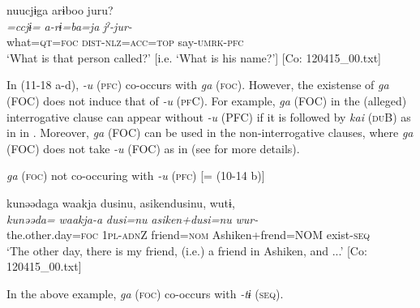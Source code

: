   \ex  
      \glll    nuucjɨga  arɨboo  juru?\\
      \textit{=ccjɨ=}  \textit{a-rɨ=ba=ja}  \textit{jˀ-jur-}\\
      what=\textsc{qt}=\textsc{foc}  \textsc{dist}-\textsc{nlz}=\textsc{acc}=\textsc{top}  say-\textsc{umrk}-\textsc{pfc}\\
      \glt       ‘What is that person called?’ [i.e. ‘What is his name?’] [Co: 120415\_00.txt]
\z
\z

In (11-18 a-d), \textit{{}-u} (\textsc{pfc}) co-occurs with \textit{ga} (\textsc{foc}). However, the existense of \textit{ga} (FOC) does not induce that of \textit{{}-u} (\textsc{pf}C). For example, \textit{ga} (FOC) in the (alleged) interrogative clause can appear without \textit{-u} (PFC) if it is followed by \textit{kai} (\textsc{du}B) as in  in . Moreover, \textit{ga} (FOC) can be used in the non-interrogative clauses, where \textit{ga} (FOC) does not take \textit{{}-u} (FOC) as in  (see  for more details).

\ea\label{ex:11-19}  \textit{ga} (\textsc{foc}) not co-occuring with \textit{-u} (\textsc{pfc}) [= (10-14 b)]
  
      \glll    kunəədaga  waakja  dusinu,  asikendusinu,  wutɨ,\\
    \textit{kunəəda=}  \textit{waakja-a}  \textit{dusi=nu}  \textit{asiken+dusi=nu}  \textit{wur-}\\
    the.other.day=\textsc{foc}  1\textsc{pl}-\textsc{adn}Z  friend=\textsc{nom}  Ashiken+frend=NOM  exist{}-\textsc{seq}\\
    \glt     ‘The other day, there is my friend, (i.e.) a friend in Ashiken, and ...’ [Co: 120415\_00.txt]
\z

In the above example, \textit{ga} (\textsc{foc}) co-occurs with \textit{{}-tɨ} (\textsc{seq}).
